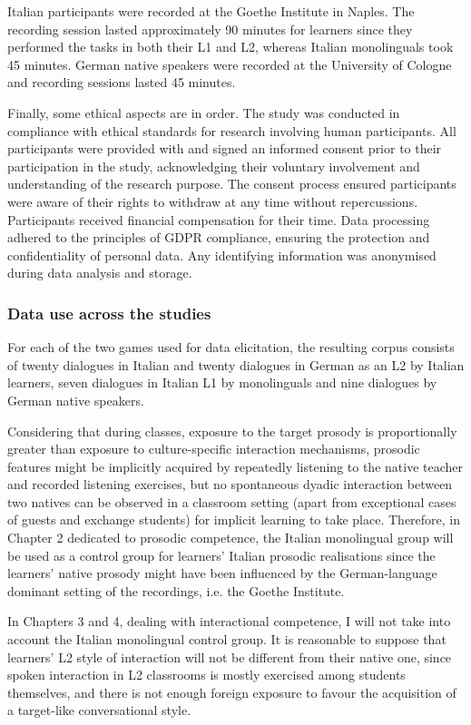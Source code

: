 Italian participants were recorded at the Goethe Institute in Naples. The recording session lasted approximately 90 minutes for learners since they performed the tasks in both their L1 and L2, whereas Italian monolinguals took 45 minutes. German native speakers were recorded at the University of Cologne and recording sessions lasted 45 minutes.

Finally, some ethical aspects are in order. The study was conducted in compliance with ethical standards for research involving human participants. All participants were provided with and signed an informed consent prior to their participation in the study, acknowledging their voluntary involvement and understanding of the research purpose. The consent process ensured participants were aware of their rights to withdraw at any time without repercussions. Participants received financial compensation for their time. Data processing adhered to the principles of GDPR compliance, ensuring the protection and confidentiality of personal data. Any identifying information was anonymised during data analysis and storage.\\

\subsubsection{ Data use across the studies}
\hypertarget{Toc191305881}{}
For each of the two games used for data elicitation, the resulting corpus consists of twenty dialogues in Italian and twenty dialogues in German as an L2 by Italian learners, seven dialogues in Italian L1 by monolinguals and nine dialogues by German native speakers.

Considering that during classes, exposure to the target prosody is proportionally greater than exposure to culture-specific interaction mechanisms, prosodic features might be implicitly acquired by repeatedly listening to the native teacher and recorded listening exercises, but no spontaneous dyadic interaction between two natives can be observed in a classroom setting (apart from exceptional cases of guests and exchange students) for implicit learning to take place. Therefore, in Chapter 2 dedicated to prosodic competence, the Italian monolingual group will be used as a control group for learners’ Italian prosodic realisations since the learners’ native prosody might have been influenced by the German-language dominant setting of the recordings, i.e. the Goethe Institute. 

In Chapters 3 and 4, dealing with interactional competence, I will not take into account the Italian monolingual control group. It is reasonable to suppose that learners’ L2 style of interaction will not be different from their native one, since spoken interaction in L2 classrooms is mostly exercised among students themselves, and there is not enough foreign exposure to favour the acquisition of a target-like conversational style. 

